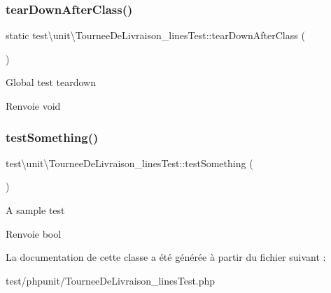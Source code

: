 \subsubsection{\texorpdfstring{tear\+Down\+After\+Class()}{tearDownAfterClass()}}
{\footnotesize\ttfamily static test\textbackslash{}unit\textbackslash{}\+Tournee\+De\+Livraison\+\_\+lines\+Test\+::tear\+Down\+After\+Class (\begin{DoxyParamCaption}{ }\end{DoxyParamCaption})\hspace{0.3cm}{\ttfamily [static]}}

Global test teardown \begin{DoxyReturn}{Renvoie}
void 
\end{DoxyReturn}
\mbox{\label{classtest_1_1unit_1_1TourneeDeLivraison__linesTest_a1e6e923be202483cac399d112aa190da}} 
\subsubsection{\texorpdfstring{test\+Something()}{testSomething()}}
{\footnotesize\ttfamily test\textbackslash{}unit\textbackslash{}\+Tournee\+De\+Livraison\+\_\+lines\+Test\+::test\+Something (\begin{DoxyParamCaption}{ }\end{DoxyParamCaption})}

A sample test \begin{DoxyReturn}{Renvoie}
bool 
\end{DoxyReturn}


La documentation de cette classe a été générée à partir du fichier suivant \+:\begin{DoxyCompactItemize}
\item 
test/phpunit/Tournee\+De\+Livraison\+\_\+lines\+Test.\+php\end{DoxyCompactItemize}
